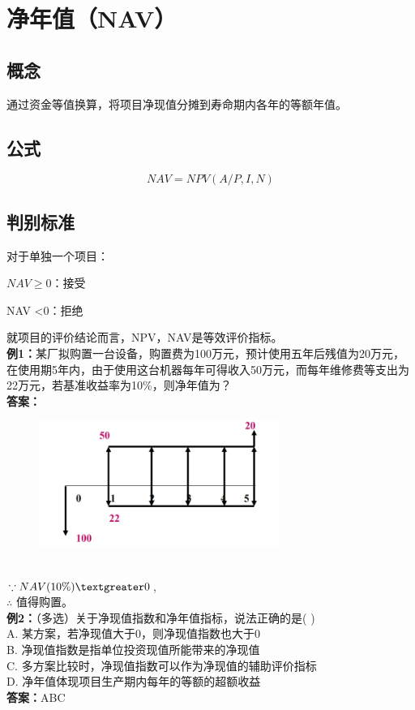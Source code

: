 \section{净年值（NAV）}

\subsection{概念}
通过资金等值换算，将项目净现值分摊到寿命期内各年的等额年值。
\subsection{公式}
$$NAV=NPV(A/P,I,N)$$
\subsection{判别标准}
对于单独一个项目：

$NAV \geq 0$：接受

NAV \textless 0：拒绝

就项目的评价结论而言，NPV，NAV是等效评价指标。\\
\textbf{例1：}某厂拟购置一台设备，购置费为100万元，预计使用五年后残值为20万元，在使用期5年内，由于使用这台机器每年可得收入50万元，而每年维修费等支出为22万元，若基准收益率为10\%，则净年值为？\\
\textbf{答案：}
\begin{figure}[H]
    \centering
    \includegraphics[width=0.7\textwidth]{image/NAV例题.png}
    \label{fig:16}
\end{figure}
\\
$\because NAV(10\%) \textgreater 0$, \\
$\therefore$ 值得购置。\\
\textbf{例2：}（多选）关于净现值指数和净年值指标，说法正确的是(  )\\
A. 某方案，若净现值大于0，则净现值指数也大于0\\
B. 净现值指数是指单位投资现值所能带来的净现值\\
C. 多方案比较时，净现值指数可以作为净现值的辅助评价指标\\
D. 净年值体现项目生产期内每年的等额的超额收益\\
\textbf{答案：}ABC

